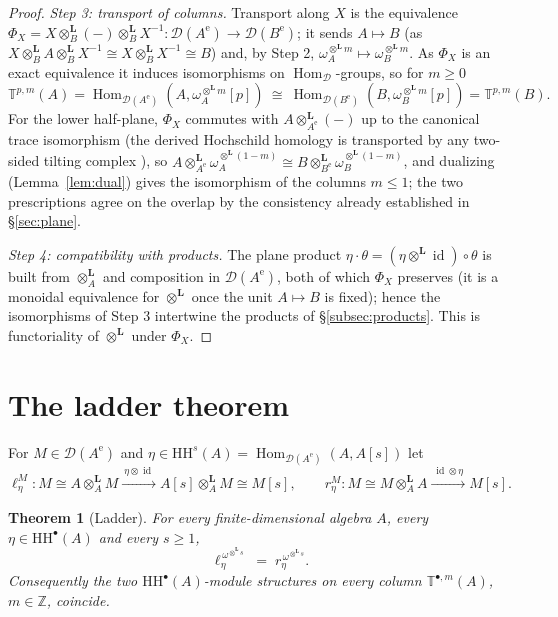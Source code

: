\documentclass[11pt]{amsart}
\newtheorem{theorem}{Theorem}[section]
\theoremstyle{definition}
\newcommand{\T}{\mathbb{T}}
\newcommand{\HH}{\mathrm{HH}}
\newcommand{\Hom}{\operatorname{Hom}}
\newcommand{\id}{\operatorname{id}}
\newcommand{\Ae}{A^{\mathrm{e}}}
\newcommand{\der}{\mathcal{D}}
\newcommand{\Lotimes}{\otimes^{\mathbf{L}}}
\begin{document}
\begin{proof}
\emph{Step 3: transport of columns.} Transport along $X$ is the equivalence
$\Phi_X=X\Lotimes_B(-)\Lotimes_BX^{-1}\colon\der(\Ae)\to\der(B^{\mathrm e})$; it
sends $A\mapsto B$ (as $X\Lotimes_BA\Lotimes_BX^{-1}\cong X\Lotimes_BX^{-1}\cong B$)
and, by Step 2, $\omega_A^{\Lotimes m}\mapsto\omega_B^{\Lotimes m}$. As $\Phi_X$
is an exact equivalence it induces isomorphisms on $\Hom_{\der}$-groups, so for
$m\ge0$
\[
\T^{p,m}(A)=\Hom_{\der(\Ae)}(A,\omega_A^{\Lotimes m}[p])
\ \cong\ \Hom_{\der(B^{\mathrm e})}(B,\omega_B^{\Lotimes m}[p])=\T^{p,m}(B).
\]
For the lower half-plane, $\Phi_X$ commutes with $A\Lotimes_{\Ae}(-)$ up to the
canonical trace isomorphism (the derived Hochschild homology is transported by
any two-sided tilting complex \cite{ArmKe2}), so
$A\Lotimes_{\Ae}\omega_A^{\Lotimes(1-m)}\cong B\Lotimes_{B^{\mathrm e}}\omega_B^{\Lotimes(1-m)}$,
and dualizing (Lemma~\ref{lem:dual}) gives the isomorphism of the columns
$m\le1$; the two prescriptions agree on the overlap by the consistency already
established in \S\ref{sec:plane}.

\emph{Step 4: compatibility with products.} The plane product
$\eta\cdot\theta=(\eta\Lotimes\id)\circ\theta$ is built from $\Lotimes_A$ and
composition in $\der(\Ae)$, both of which $\Phi_X$ preserves (it is a monoidal
equivalence for $\Lotimes$ once the unit $A\mapsto B$ is fixed); hence the
isomorphisms of Step 3 intertwine the products of
\S\ref{subsec:products}. This is functoriality of $\Lotimes$ under $\Phi_X$.
\end{proof}

\section{The ladder theorem}\label{sec:ladder}

For $M\in\der(\Ae)$ and $\eta\in\HH^s(A)=\Hom_{\der(\Ae)}(A,A[s])$ let
\[
\ell^M_\eta\colon M\cong A\Lotimes_AM
\xrightarrow{\ \eta\otimes\id\ }A[s]\Lotimes_AM\cong M[s],
\qquad
r^M_\eta\colon M\cong M\Lotimes_AA
\xrightarrow{\ \id\otimes\eta\ }M[s].
\]

\begin{theorem}[Ladder]\label{thm:ladder}
For every finite-dimensional algebra $A$, every $\eta\in\HH^\bullet(A)$ and
every $s\ge1$,
\[
\ell^{\,\omega^{\Lotimes s}}_\eta\;=\;r^{\,\omega^{\Lotimes s}}_\eta .
\]
Consequently the two $\HH^\bullet(A)$-module structures on every column
$\T^{\bullet,m}(A)$, $m\in\mathbb Z$, coincide.
\end{theorem}
\end{document}
